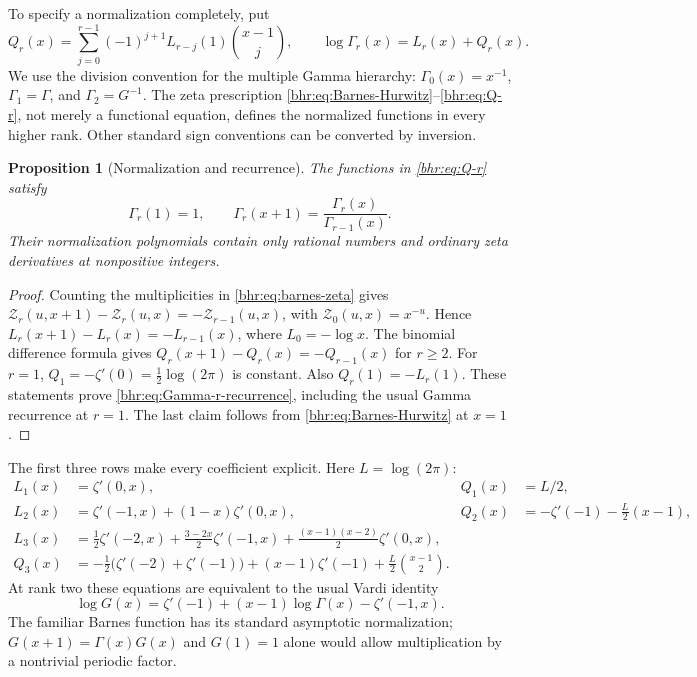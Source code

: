\documentclass[11pt]{article}
\numberwithin{equation}{section}
\theoremstyle{plain}
\newtheorem{proposition}[theorem]{Proposition}
\theoremstyle{definition}
\theoremstyle{remark}
\begin{document}
To specify a normalization completely, put
\begin{equation}\label{bhr:eq:Q-r}
 Q_r(x)=\sum_{j=0}^{r-1}(-1)^{j+1}L_{r-j}(1)
                          \binom{x-1}{j},\qquad
 \log\Gamma_r(x)=L_r(x)+Q_r(x).
\end{equation}
We use the division convention for the multiple Gamma hierarchy:
$\Gamma_0(x)=x^{-1}$, $\Gamma_1=\Gamma$, and
$\Gamma_2=G^{-1}$. The zeta prescription
\eqref{bhr:eq:Barnes-Hurwitz}--\eqref{bhr:eq:Q-r}, not merely a functional
equation, defines the normalized functions in every higher rank.
Other standard sign conventions can be converted by inversion.

\begin{proposition}[Normalization and recurrence]\label{bhr:prop:normalization}
The functions in \eqref{bhr:eq:Q-r} satisfy
\begin{equation}\label{bhr:eq:Gamma-r-recurrence}
 \Gamma_r(1)=1,\qquad
 \Gamma_r(x+1)=\frac{\Gamma_r(x)}{\Gamma_{r-1}(x)}.
\end{equation}
Their normalization polynomials contain only rational numbers and
ordinary zeta derivatives at nonpositive integers.
\end{proposition}
\begin{proof}
Counting the multiplicities in \eqref{bhr:eq:barnes-zeta} gives
$\mathcal Z_r(u,x+1)-\mathcal Z_r(u,x)=-\mathcal Z_{r-1}(u,x)$, with
$\mathcal Z_0(u,x)=x^{-u}$. Hence
$L_r(x+1)-L_r(x)=-L_{r-1}(x)$, where $L_0=-\log x$.
The binomial difference formula gives
$Q_r(x+1)-Q_r(x)=-Q_{r-1}(x)$ for $r\ge2$.
For $r=1$, $Q_1=-\zeta'(0)=\tfrac12\log(2\pi)$ is
constant. Also $Q_r(1)=-L_r(1)$. These statements prove
\eqref{bhr:eq:Gamma-r-recurrence}, including the usual Gamma
recurrence at $r=1$. The last claim follows from
\eqref{bhr:eq:Barnes-Hurwitz} at $x=1$.
\end{proof}

The first three rows make every coefficient explicit. Here
$L=\log(2\pi)$:
\begin{align}
 L_1(x)&=\zeta'(0,x),& Q_1(x)&=L/2,\label{bhr:eq:rank1}\\
 L_2(x)&=\zeta'(-1,x)+(1-x)\zeta'(0,x),&
 Q_2(x)&=-\zeta'(-1)-\tfrac L2(x-1),\label{bhr:eq:rank2}\\
 L_3(x)&=\tfrac12\zeta'(-2,x)
       +\tfrac{3-2x}{2}\zeta'(-1,x)
       +\tfrac{(x-1)(x-2)}2\zeta'(0,x),\label{bhr:eq:rank3a}\\
 Q_3(x)&=-\tfrac12\bigl(\zeta'(-2)+\zeta'(-1)\bigr)
       +(x-1)\zeta'(-1)+\tfrac L2\binom{x-1}{2}.
       \label{bhr:eq:rank3b}
\end{align}
At rank two these equations are equivalent to the usual Vardi
identity
\begin{equation}\label{bhr:eq:Vardi}
 \log G(x)=\zeta'(-1)+(x-1)\log\Gamma(x)-\zeta'(-1,x).
\end{equation}
The familiar Barnes function has its standard asymptotic
normalization; $G(x+1)=\Gamma(x)G(x)$ and $G(1)=1$ alone
would allow multiplication by a nontrivial periodic factor.
\end{document}
